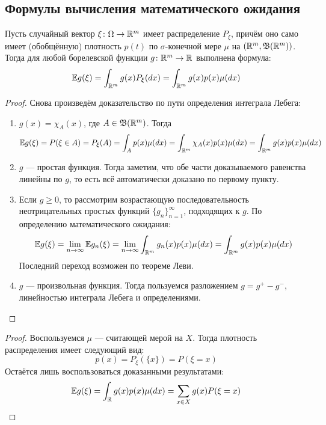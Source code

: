 \subsection{Формулы вычисления математического ожидания}

\begin{theorem}
	Пусть случайный вектор $\xi \colon \Omega \to \mathbb{R}^m$ имеет распределение $P_\xi$, причём оно само имеет (обобщённую) плотность $p(t)$ по $\sigma$-конечной мере $\mu$ на $(\mathbb{R}^m, \mathfrak{B}(\mathbb{R}^m))$. Тогда для любой борелевской функции $g \colon \mathbb{R}^m \to \mathbb{R}$ выполнена формула:
	\[
	\mathbb{E} g(\xi) = \int_{\mathbb{R}^m} g(x)P_\xi(dx) = \int_{\mathbb{R}^m} g(x)p(x)\mu(dx)
	\]
\end{theorem}

\begin{proof}
	Снова произведём доказательство по пути определения интеграла Лебега:
	\begin{enumerate}
		\item $g(x) =\chi_A(x)$, где $A \in \mathfrak{B}(\mathbb{R}^m)$. Тогда
		\[
			\mathbb{E} g(\xi) = P(\xi \in A) = P_\xi(A) = \int_A p(x)\mu(dx) = \int_{\mathbb{R}^m} \chi_A(x)p(x)\mu(dx) = \int_{\mathbb{R}^m} g(x)p(x)\mu(dx)
		\]
		
		\item $g$ --- простая функция. Тогда заметим, что обе части доказываемого равенства линейны по $g$, то есть всё автоматически доказано по первому пункту.
		
		\item Если $g \ge 0$, то рассмотрим возрастающую последовательность неотрицательных простых функций $\{g_n\}_{n = 1}^\infty$, подходящих к $g$. По определению математического ожидания:
		\[
			\mathbb{E} g(\xi) = \lim_{n \to \infty} \mathbb{E} g_n(\xi) = \lim_{n \to \infty} \int_{\mathbb{R}^m} g_n(x)p(x)\mu(dx) = \int_{\mathbb{R}^m} g(x)p(x)\mu(dx)
		\]
		Последний переход возможен по теореме Леви.
		
		\item $g$ --- произвольная функция. Тогда пользуемся разложением $g = g^+ - g^-$, линейностью интеграла Лебега и определениями.
	\end{enumerate}
\end{proof}

\begin{proof}
	Воспользуемся $\mu$ --- считающей мерой на $X$. Тогда плотность распределения имеет следующий вид:
	\[
		p(x) = P_\xi(\{x\}) = P(\xi = x)
	\]
	Остаётся лишь воспользоваться доказанными результатами:
	\[
		\mathbb{E} g(\xi) = \int_{\mathbb{R}} g(x)p(x)\mu(dx) = \sum_{x \in X} g(x)P(\xi = x)
	\]
\end{proof}

